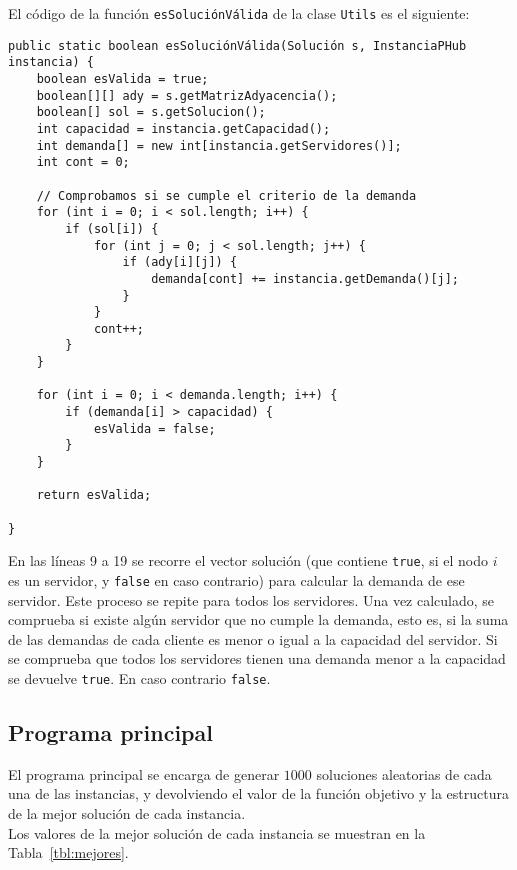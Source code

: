 \documentclass[11pt,a4paper,twoside,openright,titlepage,final]{article}
\begin{document}
El código de la función \texttt{esSoluciónVálida} de la clase \texttt{Utils} es el siguiente:

\begin{verbatim}
public static boolean esSoluciónVálida(Solución s, InstanciaPHub instancia) {
    boolean esValida = true;
    boolean[][] ady = s.getMatrizAdyacencia();
    boolean[] sol = s.getSolucion();
    int capacidad = instancia.getCapacidad();
    int demanda[] = new int[instancia.getServidores()];
    int cont = 0;
	
    // Comprobamos si se cumple el criterio de la demanda
    for (int i = 0; i < sol.length; i++) {
        if (sol[i]) {
            for (int j = 0; j < sol.length; j++) {
                if (ady[i][j]) {
                    demanda[cont] += instancia.getDemanda()[j];
                }
            }
            cont++;
        } 
    }
	
    for (int i = 0; i < demanda.length; i++) {
        if (demanda[i] > capacidad) {
		    esValida = false;
        }
    }
	
    return esValida;
	
}
\end{verbatim}

En las líneas 9 a 19 se recorre el vector solución (que contiene \texttt{true}, si el nodo $i$ es un servidor, y \texttt{false} en caso contrario) para calcular la demanda de ese servidor. Este proceso se repite para todos los servidores. Una vez calculado, se comprueba si existe algún servidor que no cumple la demanda, esto es, si la suma de las demandas de cada cliente es menor o igual a la capacidad del servidor. Si se comprueba que todos los servidores tienen una demanda menor a la capacidad se devuelve \texttt{true}. En caso contrario \texttt{false}.

\subsection{Programa principal}

El programa principal se encarga de generar $1000$ soluciones aleatorias de cada una de las instancias, y devolviendo el valor de la función objetivo y la estructura de la mejor solución de cada instancia.\\

Los valores de la mejor solución de cada instancia se muestran en la Tabla~\ref{tbl:mejores}.\\
\end{document}
